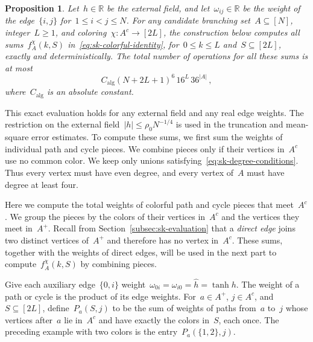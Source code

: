 \documentclass[letterpaper,11pt,reqno]{amsart}
\makeatletter
\renewcommand{\leq}{\leqslant}
\renewcommand{\geq}{\geqslant}
\newcommand{\hh}{\hat{h}}
\renewcommand{\paragraph}[1]{\if@noskipsec\leavevmode\fi\par\addvspace{.5\baselineskip plus .2\baselineskip}\noindent{\normalfont\bfseries #1}\hspace{.5em}\ignorespaces}
\newtheorem{proposition}[theorem]{Proposition}
\makeatother
\begin{document}
\begin{proposition}\label{prop:sk-colorful}
Let~$h\in\mathbb R$ be the external field, and let~$\omega_{ij}\in\mathbb R$ be the weight of the edge~$\{i,j\}$ for~$1\leq i<j\leq N$. For any candidate branching set~$A\subseteq[N]$, integer~$L\geq1$, and coloring~$\chi:A^c\to[2L]$, the construction below computes all sums~$f_A^\chi(k,S)$ in~\eqref{eq:sk-colorful-identity}, for~$0\leq k\leq L$ and~$S\subseteq[2L]$, exactly and deterministically. The total number of operations for all these sums is at most
\begin{equation}\label{eq:sk-colorful-cost}
C_{\mathrm{alg}}(N+2L+1)^6\,16^L\,36^{|A|}\,,
\end{equation}
where~$C_{\mathrm{alg}}$ is an absolute constant.
\end{proposition}

This exact evaluation holds for any external field and any real edge weights. The restriction on the external field~$|h|\leq\rho_0N^{-1/4}$ is used in the truncation and mean-square error estimates. To compute these sums, we first sum the weights of individual path and cycle pieces. We combine pieces only if their vertices in~$A^c$ use no common color. We keep only unions satisfying~\eqref{eq:sk-degree-conditions}. Thus every vertex must have even degree, and every vertex of~$A$ must have degree at least four.

\paragraph{Weights of paths and cycles.}
Here we compute the total weights of colorful path and cycle pieces that meet~$A^c$. We group the pieces by the colors of their vertices in~$A^c$ and the vertices they meet in~$A^+$. Recall from Section~\ref{subsec:sk-evaluation} that a \emph{direct edge} joins two distinct vertices of~$A^+$ and therefore has no vertex in~$A^c$. These sums, together with the weights of direct edges, will be used in the next part to compute~$f_A^\chi(k,S)$ by combining pieces.

Give each auxiliary edge~$\{0,i\}$ weight~$\omega_{0i}=\omega_{i0}=\hh=\tanh h$. The weight of a path or cycle is the product of its edge weights. For~$a\in A^+$, $j\in A^c$, and~$S\subseteq[2L]$, define~$P_a(S,j)$ to be the sum of weights of paths from~$a$ to~$j$ whose vertices after~$a$ lie in~$A^c$ and have exactly the colors in~$S$, each once. The preceding example with two colors is the entry~$P_a(\{1,2\},j)$.
\end{document}
